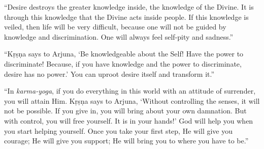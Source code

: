 \enquote{Desire destroys the greater knowledge inside, the knowledge of the Divine. It is through this knowledge that the Divine acts inside people. If this knowledge is veiled, then life will be very difficult, because one will not be guided by knowledge and discrimination. One will always feel self-pity and sadness.}

\enquote{Kṛṣṇa says to Arjuna, \enquote{Be knowledgeable about the Self! Have the power to discriminate! Because, if you have knowledge and the power to discriminate, desire has no power.} You can uproot desire itself and transform it.}

\enquote{In \textit{karma-yoga}, if you do everything in this world with an attitude of surrender, you will attain Him. Kṛṣṇa says to Arjuna, \enquote{Without controlling the senses, it will not be possible. If you give in, you will bring about your own damnation. But with control, you will free yourself. It is in your hands!} God will help you when you start helping yourself. Once you take your first step, He will give you courage; He will give you support; He will bring you to where you have to be.}

